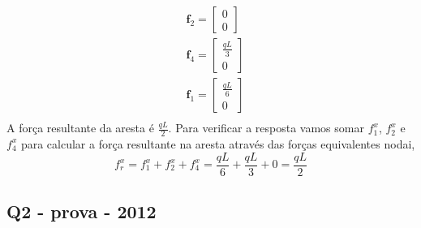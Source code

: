\begin{equation}
	\begin{split}
		&\mathbf{f}_2
		= 
		\begin{bmatrix}
			0\\
			0
		\end{bmatrix}\\
		&\mathbf{f}_4
		= 
		\begin{bmatrix}
			\frac{q L}{3}\\
			0
		\end{bmatrix}\\
		&\mathbf{f}_1
		= 
		\begin{bmatrix}
		\frac{q L}{6}\\
		0
	\end{bmatrix}\\	
	\end{split}
\end{equation} 
\color{black}
%
A força resultante da aresta é $\frac{q L}{2}$. Para verificar a resposta vamos somar $f_1^x$, $f_2^x$ e $f_4^x$ para calcular a força resultante na aresta através das forças equivalentes nodai,
%
\begin{equation}
	f_r^x = f_1^x + f_2^x + f_4^x = \frac{q L}{6} + \frac{q L}{3} + 0 = \frac{q L}{2}
\end{equation}


\subsection{Q2 - prova - 2012}

